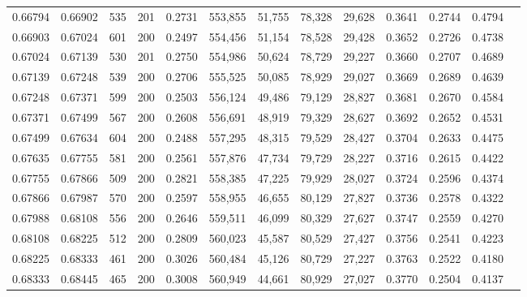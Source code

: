 \begin{tabular}{rrrrrrrrrrrrr}
0.66794 & 0.66902 &   535 & 201 &                                     0.2731 & 553,855 &  51,755 &  78,328 &  29,628 & 0.3641 & 0.2744 & 0.4794 \\
0.66903 & 0.67024 &   601 & 200 &                                     0.2497 & 554,456 &  51,154 &  78,528 &  29,428 & 0.3652 & 0.2726 & 0.4738 \\
0.67024 & 0.67139 &   530 & 201 &                                     0.2750 & 554,986 &  50,624 &  78,729 &  29,227 & 0.3660 & 0.2707 & 0.4689 \\
0.67139 & 0.67248 &   539 & 200 &                                     0.2706 & 555,525 &  50,085 &  78,929 &  29,027 & 0.3669 & 0.2689 & 0.4639 \\
0.67248 & 0.67371 &   599 & 200 &                                     0.2503 & 556,124 &  49,486 &  79,129 &  28,827 & 0.3681 & 0.2670 & 0.4584 \\
0.67371 & 0.67499 &   567 & 200 &                                     0.2608 & 556,691 &  48,919 &  79,329 &  28,627 & 0.3692 & 0.2652 & 0.4531 \\
0.67499 & 0.67634 &   604 & 200 &                                     0.2488 & 557,295 &  48,315 &  79,529 &  28,427 & 0.3704 & 0.2633 & 0.4475 \\
0.67635 & 0.67755 &   581 & 200 &                                     0.2561 & 557,876 &  47,734 &  79,729 &  28,227 & 0.3716 & 0.2615 & 0.4422 \\
0.67755 & 0.67866 &   509 & 200 &                                     0.2821 & 558,385 &  47,225 &  79,929 &  28,027 & 0.3724 & 0.2596 & 0.4374 \\
0.67866 & 0.67987 &   570 & 200 &                                     0.2597 & 558,955 &  46,655 &  80,129 &  27,827 & 0.3736 & 0.2578 & 0.4322 \\
0.67988 & 0.68108 &   556 & 200 &                                     0.2646 & 559,511 &  46,099 &  80,329 &  27,627 & 0.3747 & 0.2559 & 0.4270 \\
0.68108 & 0.68225 &   512 & 200 &                                     0.2809 & 560,023 &  45,587 &  80,529 &  27,427 & 0.3756 & 0.2541 & 0.4223 \\
0.68225 & 0.68333 &   461 & 200 &                                     0.3026 & 560,484 &  45,126 &  80,729 &  27,227 & 0.3763 & 0.2522 & 0.4180 \\
0.68333 & 0.68445 &   465 & 200 &                                     0.3008 & 560,949 &  44,661 &  80,929 &  27,027 & 0.3770 & 0.2504 & 0.4137 \\

\end{tabular}
